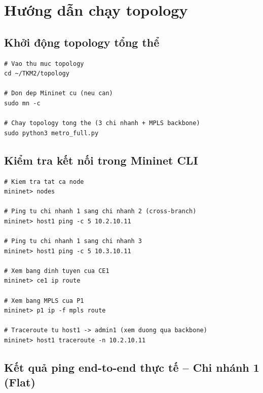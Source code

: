 \section{Hướng dẫn chạy topology}

\subsection{Khởi động topology tổng thể}

\begin{lstlisting}[style=bashstyle, caption={Chạy toàn bộ hệ thống Metro Ethernet MPLS}]
# Vao thu muc topology
cd ~/TKM2/topology

# Don dep Mininet cu (neu can)
sudo mn -c

# Chay topology tong the (3 chi nhanh + MPLS backbone)
sudo python3 metro_full.py
\end{lstlisting}

\subsection{Kiểm tra kết nối trong Mininet CLI}

\begin{lstlisting}[style=bashstyle, caption={Các lệnh kiểm tra cơ bản trong Mininet CLI}]
# Kiem tra tat ca node
mininet> nodes

# Ping tu chi nhanh 1 sang chi nhanh 2 (cross-branch)
mininet> host1 ping -c 5 10.2.10.11

# Ping tu chi nhanh 1 sang chi nhanh 3
mininet> host1 ping -c 5 10.3.10.11

# Xem bang dinh tuyen cua CE1
mininet> ce1 ip route

# Xem bang MPLS cua P1
mininet> p1 ip -f mpls route

# Traceroute tu host1 -> admin1 (xem duong qua backbone)
mininet> host1 traceroute -n 10.2.10.11
\end{lstlisting}

\subsection{Kết quả ping end-to-end thực tế -- Chi nhánh 1 (Flat)}

